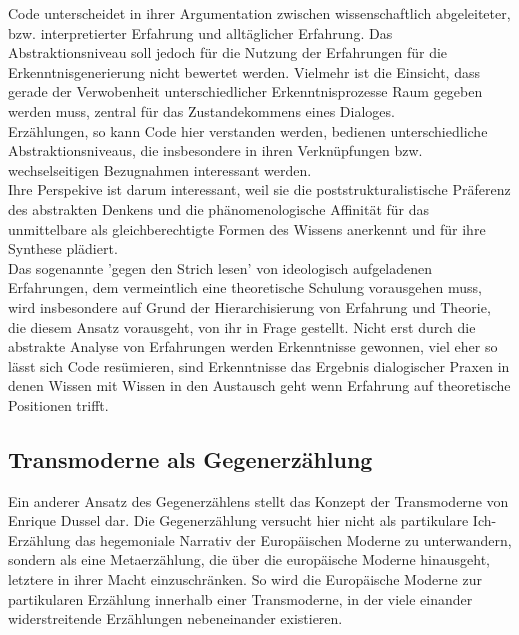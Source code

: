 \noindent Code unterscheidet in ihrer Argumentation zwischen wissenschaftlich
abgeleiteter, bzw. interpretierter Erfahrung und alltäglicher Erfahrung. Das
Abstraktionsniveau soll jedoch für die Nutzung der Erfahrungen für die
Erkenntnisgenerierung nicht bewertet werden. Vielmehr ist die Einsicht, dass
gerade der Verwobenheit unterschiedlicher Erkenntnisprozesse Raum gegeben werden
muss, zentral für das Zustandekommens eines Dialoges.\footnotemark
{}\\

\noindent Erzählungen, so kann Code hier verstanden werden, bedienen unterschiedliche
Abstraktionsniveaus, die insbesondere in ihren Verknüpfungen bzw.
wechselseitigen Bezugnahmen interessant werden.\\
Ihre Perspekive ist darum interessant, weil sie die poststrukturalistische
Präferenz des abstrakten Denkens und die phänomenologische Affinität für das
unmittelbare als gleichberechtigte Formen des Wissens anerkennt und für ihre
Synthese plädiert. \\
Das sogenannte 'gegen den Strich lesen' von ideologisch
aufgeladenen Erfahrungen, dem vermeintlich eine theoretische Schulung
vorausgehen muss, wird insbesondere auf Grund der Hierarchisierung von Erfahrung
und Theorie, die diesem Ansatz vorausgeht, von ihr in Frage gestellt. Nicht erst
durch die abstrakte Analyse von  Erfahrungen werden Erkenntnisse gewonnen, viel
eher so lässt sich Code resümieren, sind Erkenntnisse das Ergebnis dialogischer
Praxen in denen Wissen mit Wissen in den Austausch geht wenn Erfahrung auf
theoretische Positionen trifft.
\newpage
\subsection{Transmoderne als Gegenerzählung}
Ein anderer Ansatz des Gegenerzählens stellt das Konzept der Transmoderne von
Enrique Dussel dar.\footnotemark{} Die Gegenerzählung versucht hier nicht als partikulare
Ich-Erzählung das hegemoniale Narrativ der Europäischen Moderne zu unterwandern,
sondern als eine Metaerzählung, die über die europäische Moderne hinausgeht,
letztere in ihrer Macht einzuschränken. So wird die Europäische Moderne zur
partikularen Erzählung innerhalb einer Transmoderne, in der viele einander
widerstreitende Erzählungen nebeneinander existieren.\\

